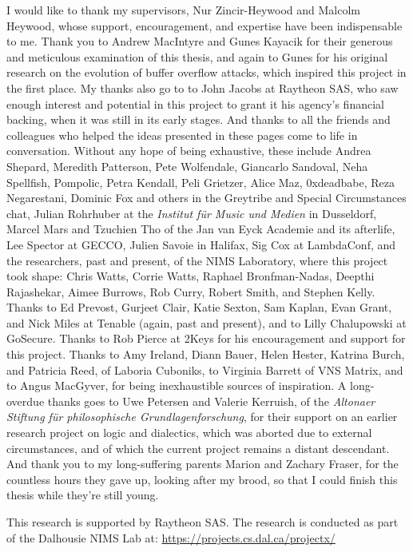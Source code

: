 \printnoidxglossaries
\clearpage
{}

\begin{acknowledgements}
I would like to thank my supervisors, Nur Zincir-Heywood and Malcolm Heywood,
whose support, encouragement, and expertise have been indispensable to me. Thank
you to Andrew MacIntyre and Gunes Kayacik for their generous and meticulous
examination of this thesis, and again to Gunes for his original research on the
evolution of buffer overflow attacks, which inspired this project in the first
place. My thanks also go to to John Jacobs at Raytheon SAS, who saw enough
interest and potential in this project to grant it his agency's financial
backing, when it was still in its early stages. And thanks to all the friends
and colleagues who helped the ideas presented in these pages come to life in
conversation. Without any hope of being exhaustive, these include Andrea
Shepard, Meredith Patterson, Pete Wolfendale, Giancarlo Sandoval, Neha
Spellfish, Pompolic, Petra Kendall, Peli Grietzer, Alice Maz, 0xdeadbabe, Reza
Negarestani, Dominic Fox and others in the Greytribe and Special Circumstances
chat, Julian Rohrhuber at the \emph{Institut f\"ur Music und Medien} in
Dusseldorf, Marcel Mars and Tzuchien Tho of the Jan van Eyck Academie and its
afterlife, Lee Spector at GECCO, Julien Savoie in Halifax, Sig Cox at
LambdaConf, and the researchers, past and present, of the NIMS Laboratory, where
this project took shape: Chris Watts, Corrie Watts, Raphael Bronfman-Nadas,
Deepthi Rajashekar, Aimee Burrows, Rob Curry, Robert Smith, and Stephen Kelly.
Thanks to Ed Prevost, Gurjeet Clair, Katie Sexton, Sam Kaplan, Evan Grant, and
Nick Miles at Tenable (again, past and present), and to Lilly Chalupowski at
GoSecure. Thanks to Rob Pierce at 2Keys for his encouragement and support for
this project. Thanks to Amy Ireland, Diann Bauer, Helen Hester, Katrina Burch,
and Patricia Reed, of Laboria Cuboniks, to Virginia Barrett of VNS Matrix, and
to Angus MacGyver, for being inexhaustible sources of inspiration. A
long-overdue thanks goes to Uwe Petersen and Valerie Kerruish, of the
\emph{Altonaer Stiftung für philosophische Grundlagenforschung}, for their
support on an earlier research project on logic and dialectics, which was aborted due to
external circumstances, and of which the current project remains a distant
descendant. And thank you to my long-suffering parents Marion and Zachary
Fraser, for the countless hours they gave up, looking after my brood, so that I
could finish this thesis while they're still young.

This research is supported by Raytheon SAS. The research is conducted
as part of the Dalhousie NIMS Lab at: \url{https://projects.cs.dal.ca/projectx/}
\end{acknowledgements}

\clearpage
\mainmatter